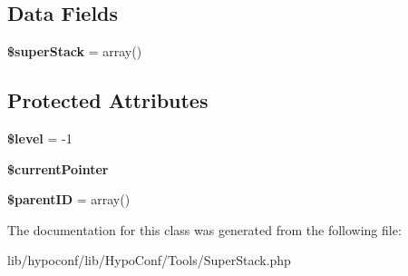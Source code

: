 \subsection*{\-Data \-Fields}
\begin{DoxyCompactItemize}
\item 
\hypertarget{class_tools_1_1_super_stack_1_1_super_stack_ace073c9a1a255e82ad85a0efec5865ea}{
{\bfseries \$super\-Stack} = array()}
\label{class_tools_1_1_super_stack_1_1_super_stack_ace073c9a1a255e82ad85a0efec5865ea}

\end{DoxyCompactItemize}
\subsection*{\-Protected \-Attributes}
\begin{DoxyCompactItemize}
\item 
\hypertarget{class_tools_1_1_super_stack_1_1_super_stack_abd32cc82c6a3f79491987de36ad580ca}{
{\bfseries \$level} = -\/1}
\label{class_tools_1_1_super_stack_1_1_super_stack_abd32cc82c6a3f79491987de36ad580ca}

\item 
\hypertarget{class_tools_1_1_super_stack_1_1_super_stack_ac351d413360fcfde69afc645f896375c}{
{\bfseries \$current\-Pointer}}
\label{class_tools_1_1_super_stack_1_1_super_stack_ac351d413360fcfde69afc645f896375c}

\item 
\hypertarget{class_tools_1_1_super_stack_1_1_super_stack_a956a5cfcdcd329658ab854d3967bd355}{
{\bfseries \$parent\-I\-D} = array()}
\label{class_tools_1_1_super_stack_1_1_super_stack_a956a5cfcdcd329658ab854d3967bd355}

\end{DoxyCompactItemize}


\-The documentation for this class was generated from the following file\-:\begin{DoxyCompactItemize}
\item 
lib/hypoconf/lib/\-Hypo\-Conf/\-Tools/\-Super\-Stack.\-php\end{DoxyCompactItemize}
